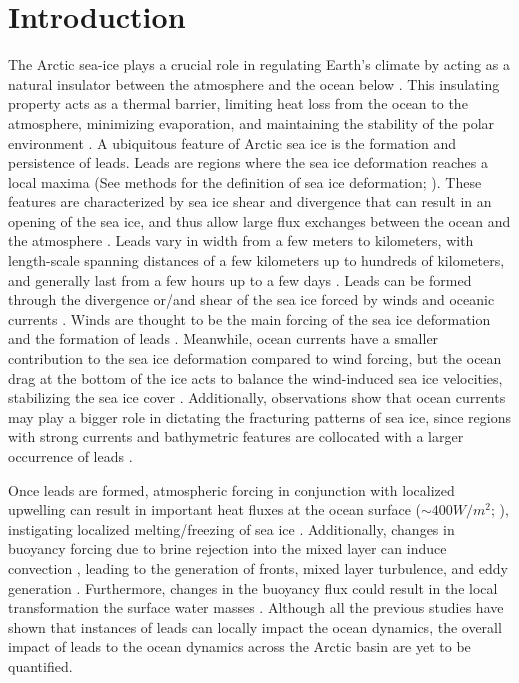 \documentclass[draft]{agujournal2019}
\begin{document}
\section*{Introduction}

The Arctic sea-ice plays a crucial role in regulating Earth's climate by acting as a natural insulator between the atmosphere and the ocean below \citep{Wettlaufer_insulator_1997, Untersteiner_ice_insulator_1961}. This insulating property acts as a thermal barrier, limiting heat loss from the ocean to the atmosphere, minimizing evaporation, and maintaining the stability of the polar environment \citep{Ruffieux_pack_lead_1995}. A ubiquitous feature of Arctic sea ice is the formation and persistence of leads. Leads are regions where the sea ice deformation reaches a local maxima (See methods for the definition of sea ice deformation; \citealt{Hutter_identification_2019}). These features are characterized by sea ice shear and divergence that can result in an opening of the sea ice, and thus allow large flux exchanges between the ocean and the atmosphere \citep{Lupkes_leads_2008}. Leads vary in width from a few meters to kilometers, with length-scale spanning distances of a few kilometers up to hundreds of kilometers, and generally last from a few hours up to a few days \citep{Linow_lkf_2017, Wernecke_Lead_2015, Tschudi_obs_leads_1998}. Leads can be formed through the divergence or/and shear of the sea ice forced by winds and oceanic currents \citep{Rampal_nextsim_2016, Hutchings_model_lkf_2005, Richter_pack_stress_2002}. Winds are thought to be the main forcing of the sea ice deformation and the formation of leads \citep{Linow_lkf_2017, Hutter_scaling_lkf_2018}. Meanwhile, ocean currents have a smaller contribution to the sea ice deformation compared to wind forcing, but the ocean drag at the bottom of the ice acts to balance the wind-induced sea ice velocities, stabilizing the sea ice cover \citep{Weiss_scale_2004}. Additionally, observations show that ocean currents may play a bigger role in dictating the fracturing patterns of sea ice, since regions with strong currents and bathymetric features are collocated with a larger occurrence of leads \citep{Willmes_leads_currents_2023}. 

Once leads are formed, atmospheric forcing in conjunction with localized upwelling can result in important heat fluxes at the ocean surface ($\sim 400 W/m^2$; \citealp{McPhee_LKF_2005,Marcq_flux_lead_2012,Maykut_heat_1986}), instigating localized melting/freezing of sea ice \citep{Albedyll_thickness_dis_2022}. Additionally, changes in buoyancy forcing due to brine rejection into the mixed layer can induce convection \citep{Smith_convection_1998}, leading to the generation of fronts, mixed layer turbulence, and eddy generation \citep{Reiser_LKF_2020, Smith_generation_2002}. Furthermore, changes in the buoyancy flux could result in the local transformation the surface water masses \citep{Pemberton_WMT_2015, Smith_polynyas_1990, Walin_WMT_1982}. 
Although all the previous studies have shown that instances of leads can locally impact the ocean dynamics, the overall impact of leads to the ocean dynamics across the Arctic basin are yet to be quantified. 
\end{document}
